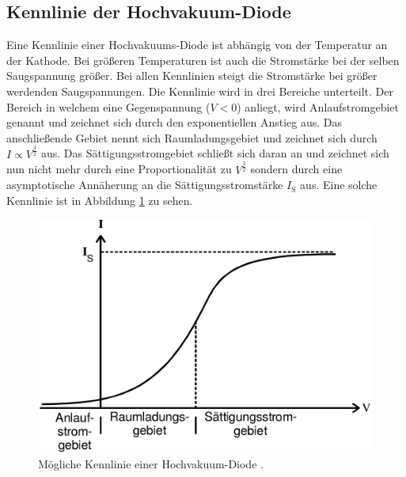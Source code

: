 \subsection{Kennlinie der Hochvakuum-Diode}
Eine Kennlinie einer Hochvakuums-Diode ist abhängig von der Temperatur an der Kathode. Bei größeren Temperaturen ist auch die Stromstärke bei der selben Saugspannung größer. Bei allen Kennlinien steigt die Stromstärke bei größer werdenden Saugspannungen. Die Kennlinie wird in drei Bereiche unterteilt. Der Bereich in welchem eine Gegenspannung ($V<0$) anliegt, wird Anlaufstromgebiet genannt und zeichnet sich durch den exponentiellen Anstieg aus. Das anschließende Gebiet nennt sich Raumladungsgebiet und zeichnet sich durch $I \propto V^\frac{3}{2}$ aus. Das Sättigungsstromgebiet schließt sich daran an und zeichnet sich nun nicht mehr durch eine Proportionalität zu $V^\frac{3}{2}$ sondern durch eine asymptotische Annäherung an die Sättigungsstromstärke $I_\text{S}$ aus. Eine solche Kennlinie ist in Abbildung \ref{fig:Kennlinie} zu sehen.
\begin{figure}
	\centering
	\includegraphics[width=\linewidth-150pt,height=\textheight-150pt,keepaspectratio]{content/Bilder/Kennlinie.png}
	\caption{Mögliche Kennlinie einer Hochvakuum-Diode \cite{V504}.}
	\label{fig:Kennlinie}
\end{figure}

